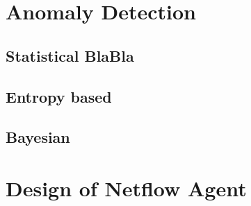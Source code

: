 
\section{Anomaly Detection}

\subsection{Statistical BlaBla}

\subsection{Entropy based}

\subsection{Bayesian}



\section{Design of Netflow Agent}
